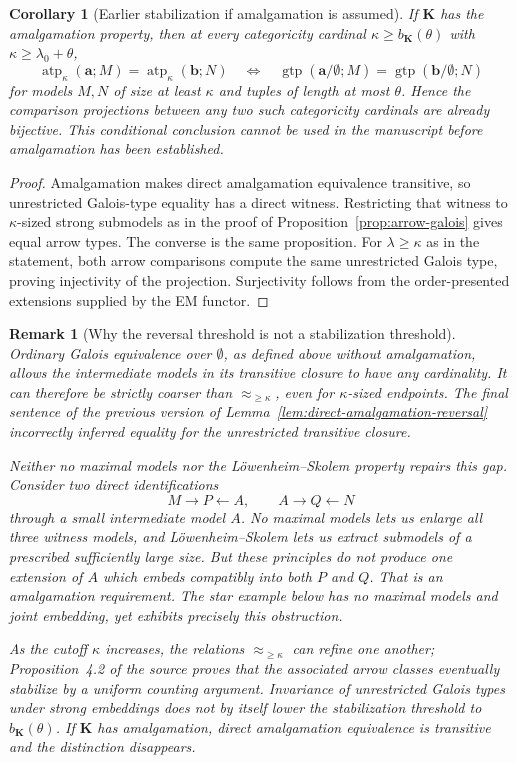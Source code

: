 \documentclass[11pt]{article}
\newcommand{\K}{\mathbf K}
\newcommand{\atp}{\operatorname{atp}}
\newcommand{\gtp}{\operatorname{gtp}}
\newcommand{\ba}{\mathbf{a}}
\newcommand{\bb}{\mathbf{b}}
\theoremstyle{plain}
\newtheorem{corollary}[definition]{Corollary}
\newtheorem{remark}[definition]{Remark}
\begin{document}
\begin{corollary}[Earlier stabilization if amalgamation is assumed]
\label{cor:ap-lowers-stabilization}
If $\K$ has the amalgamation property, then at every
categoricity cardinal $\kappa\geq b_\K(\theta)$
with $\kappa\geq\lambda_0+\theta$,
\[
\atp_\kappa(\ba;M)=\atp_\kappa(\bb;N)
\quad\Longleftrightarrow\quad
\gtp(\ba/\emptyset;M)=\gtp(\bb/\emptyset;N)
\]
for models $M,N$ of size at least $\kappa$ and
tuples of length at most $\theta$.
Hence the comparison projections between any two
such categoricity cardinals are already bijective.
This conditional conclusion cannot be used in the
manuscript before amalgamation has been established.
\end{corollary}
\begin{proof}
Amalgamation makes direct amalgamation equivalence
transitive, so unrestricted Galois-type equality
has a direct witness. Restricting that witness to
$\kappa$-sized strong submodels as in the proof of
Proposition~\ref{prop:arrow-galois} gives equal
arrow types. The converse is the same proposition.
For $\lambda\geq\kappa$ as in the statement,
both arrow comparisons compute the same unrestricted
Galois type, proving injectivity of the projection.
Surjectivity follows from the order-presented
extensions supplied by the EM functor.
\end{proof}

\begin{remark}[Why the reversal threshold is not a stabilization threshold]
\label{rem:gtp-not-stabilization}
Ordinary Galois equivalence over $\emptyset$,
as defined above without amalgamation, allows
the intermediate models in its transitive
closure to have \emph{any} cardinality.
It can therefore be strictly coarser than
$\approx_{\geq\kappa}$, even for $\kappa$-sized
endpoints. The final sentence of the
previous version of Lemma~\ref{lem:direct-amalgamation-reversal}
incorrectly inferred equality for the
unrestricted transitive closure.

Neither \emph{no maximal models} nor the
L\"owenheim--Skolem property repairs this gap.
Consider two direct identifications
\[
M\longrightarrow P\longleftarrow A,
\qquad
A\longrightarrow Q\longleftarrow N
\]
through a small intermediate model $A$.
No maximal models lets us enlarge all three
witness models, and L\"owenheim--Skolem lets
us extract submodels of a prescribed sufficiently
large size. But these principles do not produce
\emph{one extension of $A$} which embeds
compatibly into both $P$ and $Q$.
That is an amalgamation requirement.
The star example below has no maximal models
and joint embedding, yet exhibits precisely
this obstruction.

As the cutoff $\kappa$ increases, the relations
$\approx_{\geq\kappa}$ can refine one another;
Proposition~4.2 of the source proves that
the associated arrow classes eventually stabilize
by a uniform counting argument. Invariance of
unrestricted Galois types under strong embeddings
does not by itself lower the stabilization threshold
to $b_\K(\theta)$. If $\K$ has amalgamation,
direct amalgamation equivalence is transitive
and the distinction disappears.
\end{remark}
\end{document}
